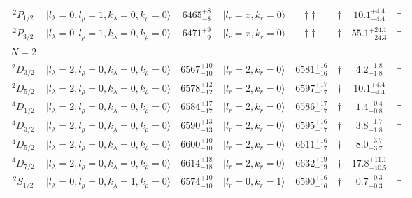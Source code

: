 \begin{tabular}{c| c c c c c c c}
$^{2}P_{1/2}$ & $\vert l_{\lambda}\!\!=\!0, l_{\rho}\!\!=\!1, k_{\lambda}\!\!=\!0, k_{\rho}\!\!=\!0 \rangle$ & $6465^{+8}_{-8}$ & $\vert l_r\!\!=\!x, k_r\!\!=\!0 \rangle$ & $\dagger\dagger$ & $\dagger$ & $10.1^{+4.4}_{-4.4}$ & $\dagger$ \\ 
$^{2}P_{3/2}$ & $\vert l_{\lambda}\!\!=\!0, l_{\rho}\!\!=\!1, k_{\lambda}\!\!=\!0, k_{\rho}\!\!=\!0 \rangle$ & $6471^{+9}_{-9}$ & $\vert l_r\!\!=\!x, k_r\!\!=\!0 \rangle$ & $\dagger\dagger$ & $\dagger$ & $55.1^{+24.1}_{-24.3}$ & $\dagger$ \\ 
\hline
 $N=2$  &  &  &  &  &  \\ 
$^{2}D_{3/2}$ & $\vert l_{\lambda}\!\!=\!2, l_{\rho}\!\!=\!0, k_{\lambda}\!\!=\!0, k_{\rho}\!\!=\!0 \rangle$ & $6567^{+10}_{-10}$ & $\vert l_r\!\!=\!2, k_r\!\!=\!0 \rangle$ & $6581^{+16}_{-16}$ & $\dagger$ & $4.2^{+1.8}_{-1.8}$ & $\dagger$ \\ 
$^{2}D_{5/2}$ & $\vert l_{\lambda}\!\!=\!2, l_{\rho}\!\!=\!0, k_{\lambda}\!\!=\!0, k_{\rho}\!\!=\!0 \rangle$ & $6578^{+12}_{-12}$ & $\vert l_r\!\!=\!2, k_r\!\!=\!0 \rangle$ & $6597^{+17}_{-17}$ & $\dagger$ & $10.1^{+4.4}_{-4.4}$ & $\dagger$ \\ 
$^{4}D_{1/2}$ & $\vert l_{\lambda}\!\!=\!2, l_{\rho}\!\!=\!0, k_{\lambda}\!\!=\!0, k_{\rho}\!\!=\!0 \rangle$ & $6584^{+17}_{-17}$ & $\vert l_r\!\!=\!2, k_r\!\!=\!0 \rangle$ & $6586^{+17}_{-17}$ & $\dagger$ & $1.4^{+0.4}_{-0.8}$ & $\dagger$ \\ 
$^{4}D_{3/2}$ & $\vert l_{\lambda}\!\!=\!2, l_{\rho}\!\!=\!0, k_{\lambda}\!\!=\!0, k_{\rho}\!\!=\!0 \rangle$ & $6590^{+13}_{-13}$ & $\vert l_r\!\!=\!2, k_r\!\!=\!0 \rangle$ & $6595^{+16}_{-17}$ & $\dagger$ & $3.8^{+1.7}_{-1.8}$ & $\dagger$ \\ 
$^{4}D_{5/2}$ & $\vert l_{\lambda}\!\!=\!2, l_{\rho}\!\!=\!0, k_{\lambda}\!\!=\!0, k_{\rho}\!\!=\!0 \rangle$ & $6600^{+10}_{-10}$ & $\vert l_r\!\!=\!2, k_r\!\!=\!0 \rangle$ & $6611^{+16}_{-17}$ & $\dagger$ & $8.0^{+3.7}_{-3.7}$ & $\dagger$ \\ 
$^{4}D_{7/2}$ & $\vert l_{\lambda}\!\!=\!2, l_{\rho}\!\!=\!0, k_{\lambda}\!\!=\!0, k_{\rho}\!\!=\!0 \rangle$ & $6614^{+18}_{-18}$ & $\vert l_r\!\!=\!2, k_r\!\!=\!0 \rangle$ & $6632^{+19}_{-19}$ & $\dagger$ & $17.8^{+11.1}_{-10.5}$ & $\dagger$ \\ 
$^{2}S_{1/2}$ & $\vert l_{\lambda}\!\!=\!0, l_{\rho}\!\!=\!0, k_{\lambda}\!\!=\!1, k_{\rho}\!\!=\!0 \rangle$ & $6574^{+10}_{-10}$ & $\vert l_r\!\!=\!0, k_r\!\!=\!1 \rangle$ & $6590^{+16}_{-16}$ & $\dagger$ & $0.7^{+0.3}_{-0.3}$ & $\dagger$ \\ 

\end{tabular}
